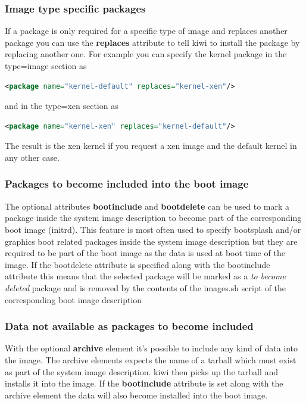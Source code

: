 \subsubsection{Image type specific packages}
If a package is only required for a specific type of image
and replaces another package you can use the \textbf{replaces} attribute
to tell kiwi to install the package by replacing another one. For example
you can specify the kernel package in the type=image section as

\begin{lstlisting}[language=xml]
<package name="kernel-default" replaces="kernel-xen"/>
\end{lstlisting}

and in the type=xen section as

\begin{lstlisting}[language=xml]
<package name="kernel-xen" replaces="kernel-default"/>
\end{lstlisting}

The result is the xen kernel if you request a xen
image and the default kernel in any other case.

\subsubsection{Packages to become included into the boot image}
The optional attributes \textbf{bootinclude} and \textbf{bootdelete}
can be used to mark a package inside the system image description to
become part of the corresponding boot image (initrd). This feature
is most often used to specify bootsplash and/or graphics boot related
packages inside the system image description but they are required
to be part of the boot image as the data is used at boot time
of the image. If the bootdelete attribute is specified along with
the bootinclude attribute this means that the selected package
will be marked as a \textit{to become deleted} package and is
removed by the contents of the images.sh script of the corresponding
boot image description

\subsubsection{Data not available as packages to become included}
With the optional \textbf{archive} element it's possible to include
any kind of data into the image. The archive elements expects the
name of a tarball which must exist as part of the system image
description. kiwi then picks up the tarball and installs it into
the image. If the \textbf{bootinclude} attribute is set along with
the archive element the data will also become installed into the
boot image.




